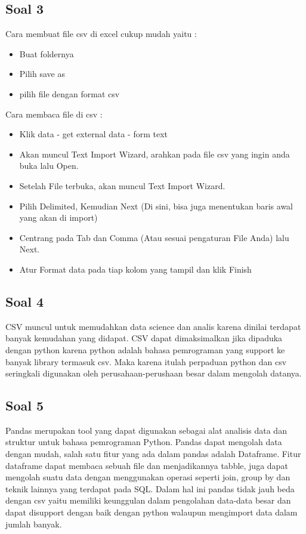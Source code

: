 \begin{enumerate}
\subsection{Soal 3}
 Cara membuat file csv di excel cukup mudah yaitu :
\begin{itemize}
	\item Buat foldernya
	\item Pilih save as
	\item pilih file dengan format csv
\end{itemize}
Cara membaca file di csv :
\begin{itemize}
	\item Klik data - get external data - form text
	\item Akan muncul Text Import Wizard, arahkan pada file csv yang ingin anda buka lalu Open.
	\item Setelah File terbuka, akan muncul Text Import Wizard.
	\item Pilih Delimited, Kemudian Next (Di sini, bisa juga menentukan baris awal yang akan di import)
	\item Centrang pada Tab dan Comma (Atau sesuai pengaturan File Anda) lalu Next.
	\item Atur Format data pada tiap kolom yang tampil dan klik Finish
\end{itemize}

\subsection{Soal 4}
 CSV muncul untuk memudahkan data science dan analis karena dinilai terdapat banyak kemudahan yang didapat. CSV dapat dimaksimalkan jika dipaduka dengan python karena python adalah bahasa pemrograman yang support ke banyak library termasuk csv. Maka karena itulah perpaduan python dan csv seringkali digunakan oleh perusahaan-perushaan besar dalam mengolah datanya.

\subsection{Soal 5}
Pandas merupakan tool yang dapat digunakan sebagai alat analisis data dan struktur untuk bahasa pemrograman Python. Pandas dapat mengolah data dengan mudah, salah satu fitur yang ada dalam pandas adalah Dataframe. Fitur dataframe dapat membaca sebuah file dan menjadikannya tabble, juga dapat mengolah suatu data dengan menggunakan operasi seperti join, group by dan teknik lainnya yang terdapat pada SQL. Dalam hal ini pandas tidak jauh beda dengan csv yaitu memiliki keunggulan dalam pengolahan data-data besar dan dapat disupport dengan baik dengan python walaupun mengimport data dalam jumlah banyak.


\end{enumerate}
